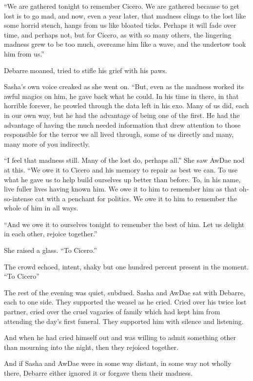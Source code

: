 ``We are gathered tonight to remember Cicero. We are gathered because to get lost is to go mad, and now, even a year later, that madness clings to the lost like some horrid stench, hangs from us like bloated ticks. Perhaps it will fade over time, and perhaps not, but for Cicero, as with so many others, the lingering madness grew to be too much, overcame him like a wave, and the undertow took him from us.''

Debarre moaned, tried to stifle his grief with his paws.

Sasha's own voice creaked as she went on. ``But, even as the madness worked its awful magics on him, he gave back what he could. In his time in there, in that horrible forever, he prowled through the data left in his exo. Many of us did, each in our own way, but he had the advantage of being one of the first. He had the advantage of having the much needed information that drew attention to those responsible for the terror we all lived through, some of us directly and many, many more of you indirectly.

``I feel that madness still. Many of the lost do, perhaps all.'' She saw AwDae nod at this. ``We owe it to Cicero and his memory to repair as best we can. To use what he gave us to help build ourselves up better than before. To, in his name, live fuller lives having known him. We owe it to him to remember him as that oh-so-intense cat with a penchant for politics. We owe it to him to remember the whole of him in all ways.

``And we owe it to ourselves tonight to remember the best of him. Let us delight in each other, rejoice together.''

She raised a glass. ``To Cicero.''

The crowd echoed, intent, shaky but one hundred percent present in the moment. ``To Cicero''

The rest of the evening was quiet, subdued. Sasha and AwDae sat with Debarre, each to one side. They supported the weasel as he cried. Cried over his twice lost partner, cried over the cruel vagaries of family which had kept him from attending the day's first funeral. They supported him with silence and listening.

And when he had cried himself out and was willing to admit something other than mourning into the night, then they rejoiced together.

And if Sasha and AwDae were in some way distant, in some way not wholly there, Debarre either ignored it or forgave them their madness.
